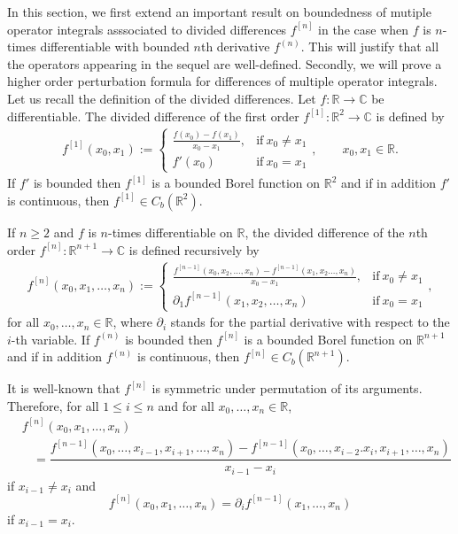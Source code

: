 \documentclass[12pt]{amsart}
\theoremstyle{remark}
\begin{document}
In this section, we first extend an important result on boundedness of mutiple operator integrals asssociated to divided differences $f^{[n]}$ in the case when $f$ is $n$-times differentiable with bounded $n$th derivative $f^{(n)}$. This will justify that all the operators appearing in the sequel are well-defined. Secondly, we will prove a higher order perturbation formula for differences of multiple operator integrals.\\


Let us recall the definition of the divided differences. Let $f : \mathbb{R} \to \mathbb{C}$ be differentiable. The divided
difference of the first order $f^{[1]}\colon\mathbb{R}^2\to\mathbb{C}$
is defined by
\begin{align*}
{f^{[1]} (x_0,x_1)} :=
\begin{cases}\frac
{ f(x_0) - f(x_1)}{x_0-x_1}, & \text{if}\ x_0
\neq x_1 \\
f'(x_0) & \text{if}\ x_0=x_1
\end{cases}, \qquad x_0, x_1\in\mathbb{R}.
\end{align*}
If $f'$ is bounded then $f^{[1]}$ is a bounded Borel function on $\mathbb{R}^2$ and
if in addition $f'$ is continuous, then $f^{[1]}\in C_b(\mathbb{R}^2)$.

If $n\geq 2$ and $f$ is $n$-times differentiable on $\mathbb{R}$, the divided difference of the $n$th
order $f^{[n]}\colon\mathbb{R}^{n+1}\to\mathbb{C}$
is defined recursively by
\begin{align*}
{f^{[n]} (x_0,x_1,\ldots,x_n)} :=
\begin{cases}\frac
{f^{[n-1]}(x_0,x_2,\ldots,x_n) - f^{[n-1]}(x_1, x_2 \ldots,x_n)}{x_0-x_1}, & \text{if}\ x_0
\neq x_1 \\
\partial_1 f^{[n-1]}(x_1,x_2,\ldots,x_n) & \text{if}\ x_0=x_1
\end{cases},
\end{align*}
for all $x_0, \ldots, x_n \in \mathbb{R}$, where $\partial_i$ stands for the partial derivative with respect to the $i$-th variable. If $f^{(n)}$ is bounded then $f^{[n]}$ is a bounded Borel function on $\mathbb{R}^{n+1}$ and if in addition $f^{(n)}$ is continuous, then $f^{[n]}\in C_b(\mathbb{R}^{n+1})$.

It is well-known that $f^{[n]}$ is symmetric under permutation of its arguments. Therefore, for all $1 \leq i \leq n$ and for all $x_0, \ldots, x_n \in \mathbb{R}$,
\begin{align*}
&f^{[n]} (x_0,x_1,\ldots,x_n) \\
& \ \ \ \ = \dfrac{f^{[n-1]}(x_0,\ldots,x_{i-1}, x_{i+1}, \ldots,x_n) - f^{[n-1]}(x_0,\ldots,x_{i-2}. x_{i},x_{i+1},\ldots,x_n)}{x_{i-1}-x_i}
\end{align*}
 if $x_{i-1} \neq x_i$ and
$$
f^{[n]} (x_0,x_1,\ldots,x_n) = \partial_i f^{[n-1]}(x_1,\ldots,x_n)
$$
if $x_{i-1}=x_i.$
\end{document}
